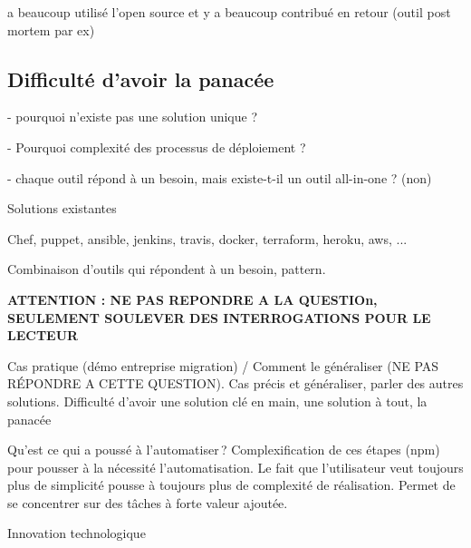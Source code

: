 a beaucoup utilisé l'open source et y a beaucoup contribué en retour (outil post mortem par ex) %

\subsection{Difficulté d'avoir la panacée}


- pourquoi n'existe pas une solution unique ? 

- Pourquoi complexité des processus de déploiement ? 

- chaque outil répond à un besoin, mais existe-t-il un outil all-in-one ? (non)

Solutions existantes

Chef, puppet, ansible, jenkins, travis, docker, terraform, heroku, aws, ...

Combinaison d'outils qui répondent à un besoin, pattern.


\textbf{ATTENTION : NE PAS REPONDRE A LA QUESTIOn, SEULEMENT SOULEVER DES INTERROGATIONS POUR LE LECTEUR}

Cas pratique (démo entreprise migration) / Comment le généraliser (NE PAS RÉPONDRE A CETTE QUESTION). Cas précis et généraliser, parler des autres solutions. Difficulté d'avoir une solution clé en main, une solution à tout, la panacée

Qu'est ce qui a poussé à l'automatiser ? Complexification de ces étapes (npm) pour pousser à la nécessité l'automatisation. Le fait que l'utilisateur veut toujours plus de simplicité pousse à toujours plus de complexité de réalisation. Permet de se concentrer sur des tâches à forte valeur ajoutée.

Innovation technologique 